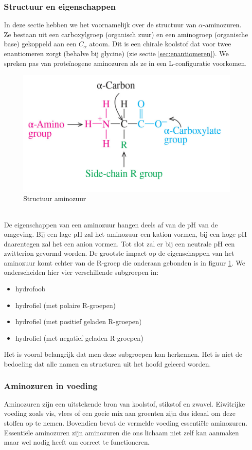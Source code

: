 \documentclass[a4paper,kul]{kulakarticle} %
\begin{document}
\subsubsection{Structuur en eigenschappen}
In deze sectie hebben we het voornamelijk over de structuur van $\alpha$-aminozuren. Ze bestaan uit een carboxylgroep (organisch zuur) en een aminogroep (organische base) gekoppeld aan een $C_{\alpha}$ atoom. Dit is een chirale koolstof dat voor twee enantiomeren zorgt (behalve bij glycine) (zie sectie \ref{sec:enantiomeren}). We spreken pas van proteïnogene aminozuren als ze in een L-configuratie voorkomen. 
\begin{figure}[h]
	\centering
	\includegraphics[width=0.7\linewidth]{AminoZuur}
	\caption[Aminozuur]{Structuur aminozuur}
	\label{fig:aminozuur}
\end{figure}\\
De eigenschappen van een aminozuur hangen deels af van de pH van de omgeving. Bij een lage pH zal het aminozuur een kation vormen, bij een hoge pH daarentegen zal het een anion vormen. Tot slot zal er bij een neutrale pH een zwitterion gevormd worden. De grootste impact op de eigenschappen van het aminozuur komt echter van de R-groep die onderaan gebonden is in figuur \ref{fig:aminozuur}. We onderscheiden hier vier verschillende subgroepen in: 
\begin{itemize}
	\item hydrofoob
	\item hydrofiel (met polaire R-groepen)
	\item hydrofiel (met positief geladen R-groepen)
	\item hydrofiel (met negatief geladen R-groepen)
\end{itemize} 
Het is vooral belangrijk dat men deze subgroepen kan herkennen. Het is niet de bedoeling dat alle namen en structuren uit het hoofd geleerd worden. 
\subsubsection{Aminozuren in voeding}
Aminozuren zijn een uitstekende bron van koolstof, stikstof en zwavel. Eiwitrijke voeding zoals vis, vlees of een goeie mix aan groenten zijn dus ideaal om deze stoffen op te nemen. Bovendien bevat de vermelde voeding essentiële aminozuren. Essentiële aminozuren zijn aminozuren die ons lichaam niet zelf kan aanmaken maar wel nodig heeft om correct te functioneren. 
\end{document}
